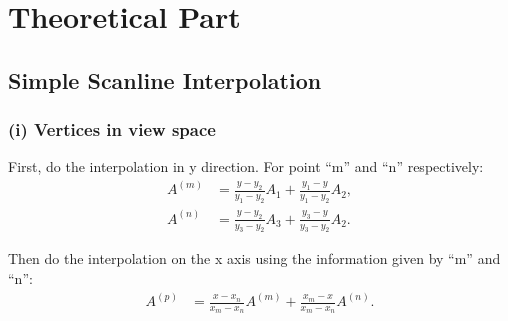\documentclass[11pt]{article}
\begin{document}
 


\section{Theoretical Part}
\subsection{Simple Scanline Interpolation}
\subsubsection*{(i) Vertices in view space}
First, do the interpolation in y direction. For point ``m'' and ``n'' respectively:
\begin{align}
    A^{(m)} &= \frac{y - y_2}{y_1 - y_2}A_1 + \frac{y_1 - y}{y_1 - y_2}A_2,\\
    A^{(n)} &= \frac{y - y_2}{y_3 - y_2}A_3 + \frac{y_3 - y}{y_3 - y_2}A_2.
\end{align}

Then do the interpolation on the x axis using the information given by ``m'' and ``n'':
\begin{align}
    A^{(p)} &= \frac{x - x_n}{x_m - x_n}A^{(m)} + \frac{x_m - x}{x_m - x_n}A^{(n)}. 
\end{align}
\end{document}
